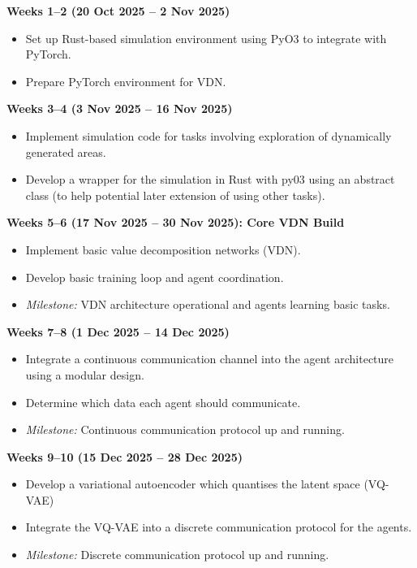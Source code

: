 \documentclass[20pt]{article}
\begin{document}
\begin{list}{}{\leftmargin=0cm \itemindent=0cm}

\item \textbf{Weeks 1--2 (20 Oct 2025 -- 2 Nov 2025)}
\begin{itemize}
\item Set up Rust-based simulation environment using PyO3 to integrate with PyTorch.
\item Prepare PyTorch environment for VDN.
\end{itemize}

\item \textbf{Weeks 3--4 (3 Nov 2025 -- 16 Nov 2025)}
\begin{itemize}
\item Implement simulation code for tasks involving exploration of dynamically generated areas.
\item Develop a wrapper for the simulation in Rust with py03 using an abstract class (to help potential later extension of using other tasks).
\end{itemize}

\item \textbf{Weeks 5--6 (17 Nov 2025 -- 30 Nov 2025): Core VDN Build}
\begin{itemize}
\item Implement basic value decomposition networks (VDN).
\item Develop basic training loop and agent coordination.
\item \textit{Milestone:} VDN architecture operational and agents learning basic tasks.
\end{itemize}

\item \textbf{Weeks 7--8 (1 Dec 2025 -- 14 Dec 2025)}
\begin{itemize}
\item Integrate a continuous communication channel into the agent architecture using a modular design.
\item Determine which data each agent should communicate.
\item \textit{Milestone:} Continuous communication protocol up and running.
\end{itemize}

\item \textbf{Weeks 9--10 (15 Dec 2025 -- 28 Dec 2025)}
\begin{itemize}
\item Develop a variational autoencoder which quantises the latent space (VQ-VAE)
\item Integrate the VQ-VAE into a discrete communication protocol for the agents.
\item \textit{Milestone:} Discrete communication protocol up and running.
\end{itemize}


\end{list}
\end{document}
